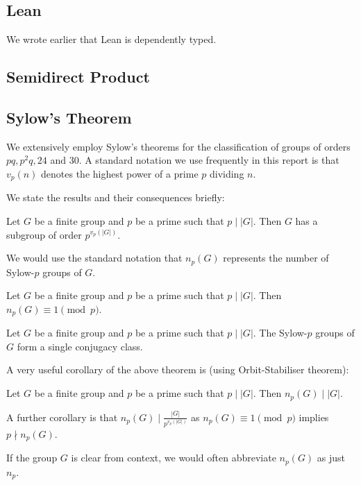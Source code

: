 \subsection{Lean}
We wrote earlier that Lean is dependently typed.

\subsection{Semidirect Product}

\subsection{Sylow's Theorem}

We extensively employ Sylow's theorems for the classification of groups of orders $pq, p^2q, 24$ and $30$. A standard notation we use frequently in this report is that $v_p(n)$ denotes the highest power of a prime $p$ dividing $n$.

We state the results and their consequences briefly:

\begin{theorem}
    Let $G$ be a finite group and $p$ be a prime such that $p \mid |G|$. Then $G$ has a subgroup of order $p^{v_p(|G|)}$.
\end{theorem}

We would use the standard notation that $n_p(G)$ represents the number of Sylow-$p$ groups of $G$.

\begin{theorem}
    Let $G$ be a finite group and $p$ be a prime such that $p \mid |G|$. Then $n_p(G) \equiv 1 \pmod p$.
\end{theorem}
\begin{theorem}
    Let $G$ be a finite group and $p$ be a prime such that $p \mid |G|$. The Sylow-$p$ groups of $G$ form a single conjugacy class.
\end{theorem}
A very useful corollary of the above theorem is (using Orbit-Stabiliser theorem):
\begin{corollary}
    Let $G$ be a finite group and $p$ be a prime such that $p \mid |G|$. Then $n_p(G) \mid |G|$.
\end{corollary}

A further corollary is that $n_p(G) \mid \frac{|G|}{p^{v_p(|G|)}}$ as $n_p(G) \equiv 1 \pmod p$ implies $p \nmid n_p(G)$.

If the group $G$ is clear from context, we would often abbreviate $n_p(G)$ as just $n_p$.

